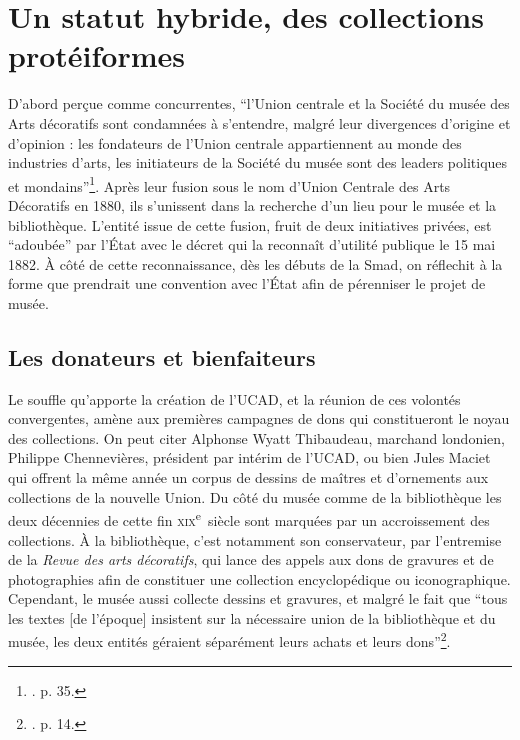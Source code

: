 \section{Un statut hybride, des collections protéiformes}

D'abord perçue comme concurrentes, \enquote{l'Union centrale et la Société du musée des Arts décoratifs sont condamnées à s'entendre, malgré leur divergences d'origine et d'opinion : les fondateurs de l'Union centrale appartiennent au monde des industries d'arts, les initiateurs de la Société du musée sont des leaders politiques et mondains}\footnote{\cite{brunhammer_beau_1992}. p. 35.}. Après leur fusion sous le nom d'Union Centrale des Arts Décoratifs en 1880, ils s'unissent dans la recherche d'un lieu pour le musée et la bibliothèque. L'entité issue de cette fusion, fruit de deux initiatives privées, est \enquote{adoubée} par l'État avec le décret qui la reconnaît d'utilité publique le 15 mai 1882. À côté de cette reconnaissance, dès les débuts de la Smad, on réflechit à la forme que prendrait une convention avec l'État afin de pérenniser le projet de musée. 

\subsection{Les donateurs et bienfaiteurs}

Le souffle qu'apporte la création de l'UCAD, et la réunion de ces volontés convergentes, amène aux premières campagnes de dons qui constitueront le noyau des collections. On peut citer Alphonse Wyatt Thibaudeau, marchand londonien, Philippe Chennevières, président par intérim de l'UCAD, ou bien Jules Maciet qui offrent la même année un corpus de dessins de maîtres et d'ornements aux collections de la nouvelle Union. Du côté du musée comme de la bibliothèque les deux décennies de cette fin \textsc{xix}\textsuperscript{e}~siècle sont marquées par un accroissement des collections. À la bibliothèque, c'est notamment son conservateur, par l'entremise de la \textit{Revue des arts décoratifs}, qui lance des appels aux dons de gravures et de photographies afin de constituer une collection encyclopédique ou iconographique. Cependant, le musée aussi collecte dessins et gravures, et malgré le fait que \enquote{tous les textes [de l'époque] insistent sur la nécessaire union de la bibliothèque et du musée, les deux entités géraient séparément leurs achats et leurs dons}\footnote{\cite{gady_dessin_2020}. p. 14.}. 

